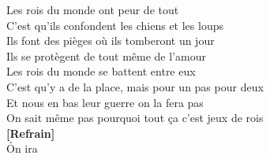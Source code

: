 \documentclass{novel}
\begin{document}
Les rois du monde ont peur de tout \\
C'est qu'ils confondent les chiens et les loups \\
Ils font des pièges où ils tomberont un jour \\
Ils se protègent de tout même de l'amour \\
Les rois du monde se battent entre eux \\
C'est qu'y a de la place, mais pour un pas pour deux \\
Et nous en bas leur guerre on la fera pas \\
On sait même pas pourquoi tout ça c'est jeux de rois \\

\textbf{[Refrain]}\\

\newpage
\normalsize
\h*{On ira}
\end{document}
